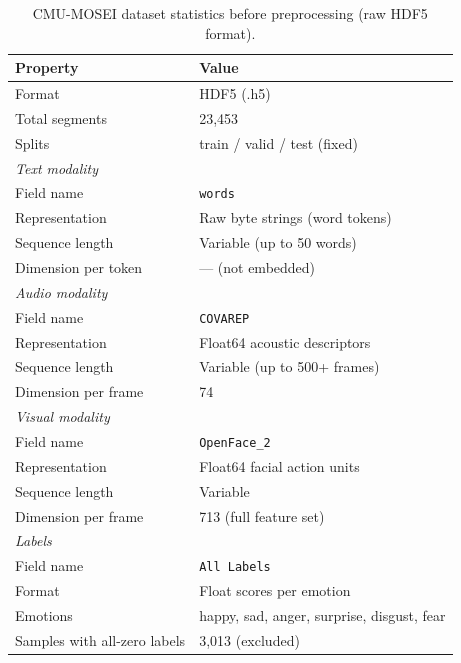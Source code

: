 \begin{table}[H]
\centering
\caption{CMU-MOSEI dataset statistics before preprocessing (raw HDF5 format).}
\label{tab:before_preprocessing}
\begin{tabular}{ll}
\hline
\textbf{Property} & \textbf{Value} \\
\hline
Format                        & HDF5 (.h5) \\
Total segments                & 23,453 \\
Splits                        & train / valid / test (fixed) \\
\hline
\multicolumn{2}{l}{\textit{Text modality}} \\
\hline
Field name                    & \texttt{words} \\
Representation                & Raw byte strings (word tokens) \\
Sequence length               & Variable (up to 50 words) \\
Dimension per token           & — (not embedded) \\
\hline
\multicolumn{2}{l}{\textit{Audio modality}} \\
\hline
Field name                    & \texttt{COVAREP} \\
Representation                & Float64 acoustic descriptors \\
Sequence length               & Variable (up to 500+ frames) \\
Dimension per frame           & 74 \\
\hline
\multicolumn{2}{l}{\textit{Visual modality}} \\
\hline
Field name                    & \texttt{OpenFace\_2} \\
Representation                & Float64 facial action units \\
Sequence length               & Variable \\
Dimension per frame           & 713 (full feature set) \\
\hline
\multicolumn{2}{l}{\textit{Labels}} \\
\hline
Field name                    & \texttt{All Labels} \\
Format                        & Float scores per emotion \\
Emotions                      & happy, sad, anger, surprise, disgust, fear \\
Samples with all-zero labels  & 3,013 (excluded) \\

\end{tabular}
\end{table}

